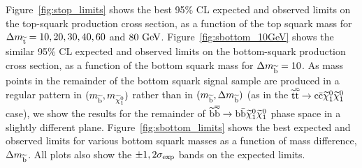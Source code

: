 %
Figure~\ref{fig:stop_limits} shows the best 95\% \ac{CL} expected and observed limits on the top-squark production cross section, 
as a function of the top squark mass for $\Delta m_{\widetilde{{\rm t}}} = 10, 20, 30, 40, 60$ and $80~\mathrm{GeV}$.
Figure~\ref{fig:sbottom_10GeV} shows the similar 95\% \ac{CL} expected and observed limits on the bottom-squark production cross section, 
as a function of the bottom squark mass for $\Delta m_{\widetilde{{\rm b}}} = 10$. 
As mass points in the remainder of the bottom squark signal sample are produced in a regular pattern in $(m_{\widetilde{{\rm b}}}, m_{\widetilde{\chi}^{0}_{1}})$ rather than in $(m_{\widetilde{{\rm b}}}, \Delta m_{\widetilde{{\rm b}}})$ (as in the $\widetilde{{\rm t}} \overline{\widetilde{\mathrm{t}}} \rightarrow \rm c \bar{\rm c} \widetilde{\chi}^{0}_{1} \widetilde{\chi}^{0}_{1}$  case), we show the results for the remainder of $\widetilde{{\rm b}} \overline{\widetilde{\mathrm{b}}} \rightarrow \rm b \bar{\rm b} \widetilde{\chi}^{0}_{1} \widetilde{\chi}^{0}_{1}$ phase space in a slightly different plane.
Figure~\ref{fig:sbottom_limits} shows the best expected and observed limits for various bottom squark masses as a function of mass difference, $\Delta m_{\widetilde{{\rm b}}}$.
All plots also show the $\pm1,2 \sigma_{\rm exp}$ bands on the expected limits.




